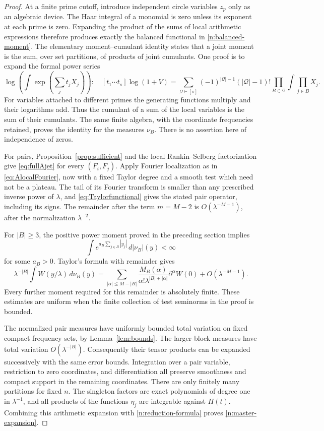 \documentclass[11pt]{article}
\numberwithin{equation}{section}
\theoremstyle{remark}
\begin{document}
\begin{proof}
At a finite prime cutoff, introduce independent circle variables $z_p$
only as an algebraic device. The Haar integral of a monomial is zero
unless its exponent at each prime is zero. Expanding the product of
the sums of local arithmetic expressions therefore produces exactly
the balanced functional in \eqref{n:balanced-moment}.
The elementary moment--cumulant identity states that a joint moment
is the sum, over set partitions, of products of joint cumulants.
One proof is to expand the formal power series
\[
 \log\!\left(\int\exp\left(\sum_jt_jX_j\right)\right):
 \quad [t_1\cdots t_s]\log(1+V)
 =\sum_{\mathcal Q\vdash[s]}
       (-1)^{|\mathcal Q|-1}(|\mathcal Q|-1)!
       \prod_{B\in\mathcal Q}\int\prod_{j\in B}X_j.
\]
For variables attached to different primes the generating functions
multiply and their logarithms add. Thus the cumulant of a sum of the
local variables is the sum of their cumulants. The same finite algebra,
with the coordinate frequencies retained, proves the identity for the
measures $\nu_B$. There is no assertion here of independence of zeros.

For pairs, Proposition~\ref{prop:sufficient} and the local
Rankin--Selberg factorization give \eqref{eq:fullAjet} for every
$(F_i,F_j)$. Apply Fourier localization as in
\eqref{eq:AlocalFourier}, now with a fixed Taylor degree and a smooth
test which need not be a plateau. The tail of its Fourier transform
is smaller than any prescribed inverse power of $\lambda$, and
\eqref{eq:Taylorfunctional} gives the stated pair operator, including
its signs. The remainder after the term $m=M-2$ is
$O(\lambda^{-M-1})$, after the normalization $\lambda^{-2}$.

For $|B|\ge3$, the positive power moment proved in the preceding
section implies
\[
 \int e^{a_B\sum_{j\in B}|y_j|}\,d|\nu_B|(y)<\infty
\]
for some $a_B>0$. Taylor's formula with remainder gives
\[
 \lambda^{-|B|}\int W(y/\lambda)\,d\nu_B(y)
 =\sum_{|\alpha|\le M-|B|}
    \frac{M_B(\alpha)}{\alpha!\lambda^{|B|+|\alpha|}}
        \partial^\alpha W(0)+O(\lambda^{-M-1}).
\]
Every further moment required for this remainder is absolutely finite.
These estimates are uniform when the finite collection of test
seminorms in the proof is bounded.

The normalized pair measures have uniformly bounded total variation
on fixed compact frequency sets, by Lemma~\ref{lem:bounds}.
The larger-block measures have total variation $O(\lambda^{-|B|})$.
Consequently their tensor products can be expanded successively with
the same error bounds. Integration over a pair variable, restriction
to zero coordinates, and differentiation all preserve smoothness and
compact support in the remaining coordinates. There are only finitely
many partitions for fixed $n$. The singleton factors are exact
polynomials of degree one in $\lambda^{-1}$, and all products of the
functions $\eta_j$ are integrable against $H(t)$.
Combining this arithmetic expansion with
\eqref{n:reduction-formula} proves \eqref{n:master-expansion}.
\end{proof}
\end{document}
